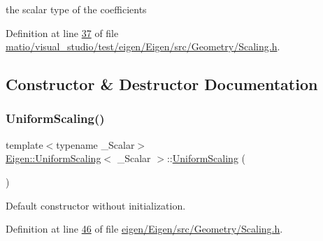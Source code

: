 the scalar type of the coefficients 

Definition at line \hyperlink{matio_2visual__studio_2test_2eigen_2_eigen_2src_2_geometry_2_scaling_8h_source_l00037}{37} of file \hyperlink{matio_2visual__studio_2test_2eigen_2_eigen_2src_2_geometry_2_scaling_8h_source}{matio/visual\+\_\+studio/test/eigen/\+Eigen/src/\+Geometry/\+Scaling.\+h}.



\subsection{Constructor \& Destructor Documentation}
\mbox{\label{class_eigen_1_1_uniform_scaling_ab17e233af501c69ff47c0dd16f43cc39}} 
\subsubsection{\texorpdfstring{Uniform\+Scaling()}{UniformScaling()}\hspace{0.1cm}{\footnotesize\ttfamily [1/6]}}
{\footnotesize\ttfamily template$<$typename \+\_\+\+Scalar$>$ \\
\hyperlink{class_eigen_1_1_uniform_scaling}{Eigen\+::\+Uniform\+Scaling}$<$ \+\_\+\+Scalar $>$\+::\hyperlink{class_eigen_1_1_uniform_scaling}{Uniform\+Scaling} (\begin{DoxyParamCaption}{ }\end{DoxyParamCaption})\hspace{0.3cm}{\ttfamily [inline]}}

Default constructor without initialization. 

Definition at line \hyperlink{eigen_2_eigen_2src_2_geometry_2_scaling_8h_source_l00046}{46} of file \hyperlink{eigen_2_eigen_2src_2_geometry_2_scaling_8h_source}{eigen/\+Eigen/src/\+Geometry/\+Scaling.\+h}.

\mbox{\label{class_eigen_1_1_uniform_scaling_a3a3e2fa318eb29c2c4f87e23a8a75144}} 

